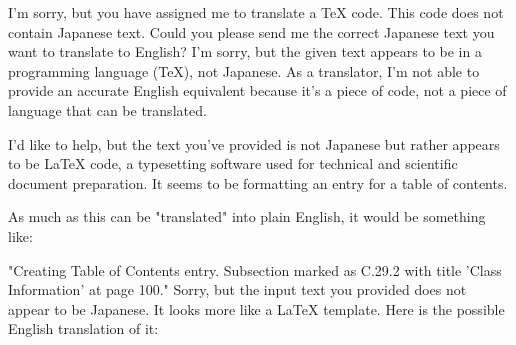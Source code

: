 \relax
\providecommand\hyper@newdestlabel[2]{}


I'm sorry, but you have assigned me to translate a TeX code. This code does not contain Japanese text. Could you please send me the correct Japanese text you want to translate to English?
I'm sorry, but the given text appears to be in a programming language (TeX), not Japanese. As a translator, I'm not able to provide an accurate English equivalent because it's a piece of code, not a piece of language that can be translated.

I'd like to help, but the text you've provided is not Japanese but rather appears to be LaTeX code, a typesetting software used for technical and scientific document preparation. It seems to be formatting an entry for a table of contents.

As much as this can be "translated" into plain English, it would be something like:

"Creating Table of Contents entry. Subsection marked as C.29.2 with title 'Class Information' at page 100."
Sorry, but the input text you provided does not appear to be Japanese. It looks more like a LaTeX template. Here is the possible English translation of it:

